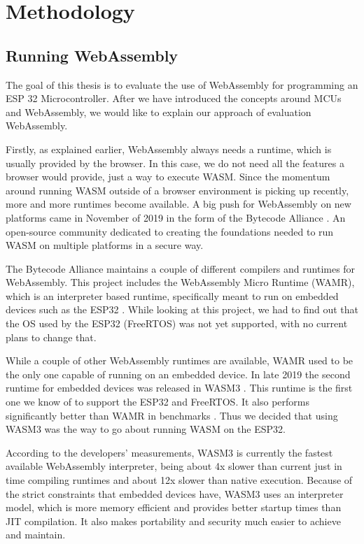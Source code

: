 
\chapter{Methodology}\label{chapter:methodology}
\section{Running WebAssembly}
The goal of this thesis is to evaluate the use of WebAssembly for programming an ESP 32 Microcontroller. After we have introduced the concepts around MCUs and WebAssembly, we would like to explain our approach of evaluation WebAssembly.

Firstly, as explained earlier, WebAssembly always needs a runtime, which is usually provided by the browser. In this case, we do not need all the features a browser would provide, just a way to execute WASM. Since the momentum around running WASM outside of a browser environment is picking up recently, more and more runtimes become available. A big push for WebAssembly on new platforms came in November of 2019 in the form of the Bytecode Alliance \autocite{noauthor_bytecode_nodate}. An open-source community dedicated to creating the foundations needed to run WASM on multiple platforms in a secure way.

The Bytecode Alliance maintains a couple of different compilers and runtimes for WebAssembly. This project includes the WebAssembly Micro Runtime (WAMR), which is an interpreter based runtime, specifically meant to run on embedded devices such as the ESP32 \autocite{noauthor_bytecodealliancewasm-micro-runtime_2020}. While looking at this project, we had to find out that the OS used by the ESP32 (FreeRTOS) was not yet supported, with no current plans to change that.

While a couple of other WebAssembly runtimes are available, \autocite{akinyemi_appcypherawesome-wasm-runtimes_2020} WAMR used to be the only one capable of running on an embedded device. In late 2019 the second runtime for embedded devices was released in WASM3 \autocite{noauthor_wasm3wasm3_2020}. This runtime is the first one we know of to support the ESP32 and FreeRTOS. It also performs significantly better than WAMR in benchmarks \autocite{shymanskyy_wasm3_2020}. Thus we decided that using WASM3 was the way to go about running WASM on the ESP32.

According to the developers' measurements, WASM3 is currently the fastest available WebAssembly interpreter, being about 4x slower than current just in time compiling runtimes and about 12x slower than native execution. Because of the strict constraints that embedded devices have, WASM3 uses an interpreter model, which is more memory efficient and provides better startup times than JIT compilation. It also makes portability and security much easier to achieve and maintain.

